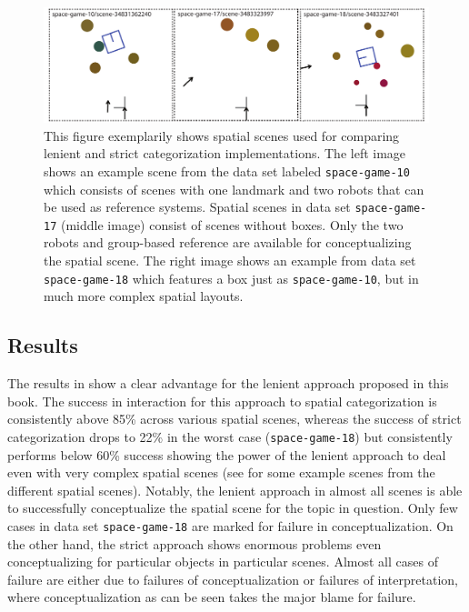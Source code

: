 \begin{figure}
\begin{center}
\includegraphics[width=.8\columnwidth]{figs/apply-filter-comparison-scenes}
\end{center}
\caption[Spatial scenes used to compare lenient vs. strict categorization]
{%
This figure exemplarily shows spatial scenes used for comparing lenient and strict
categorization implementations. The left image shows an example scene from the data 
set labeled {\footnotesize\tt space-game-10} which consists of scenes with one landmark and two robots 
that can be used as reference systems. Spatial scenes in data set {\footnotesize\tt space-game-17} (middle image) consist of scenes without boxes.
Only the two robots and group-based reference are available for conceptualizing the spatial
scene. The right image shows an example from data set {\footnotesize\tt space-game-18} which features a box 
just as {\footnotesize\tt space-game-10}, but in much more complex spatial layouts.}
\label{f:lenient-vs-strict-scenes}
\end{figure}

\subsection{Results}
The results in  show
a clear advantage for the lenient approach proposed in this 
book. The success in interaction for this approach to 
spatial categorization is consistently above 85\% across various 
spatial scenes, whereas the success of strict categorization drops to 22\%
in the worst case ({\footnotesize\tt space-game-18}) but consistently performs below 60\%
success showing the power of the lenient approach to deal even with 
very complex spatial scenes (see  for
some example scenes from the different spatial scenes). Notably,
the lenient approach in almost all scenes is able to successfully conceptualize
the spatial scene for the topic in question. Only few cases in data set {\footnotesize\tt space-game-18}
are marked for failure in conceptualization. On the other hand, the strict
approach shows enormous problems even conceptualizing for particular
objects in particular scenes. Almost all cases of failure are either due to 
failures of conceptualization or failures of interpretation, where conceptualization
as can be seen takes the major blame for failure.

